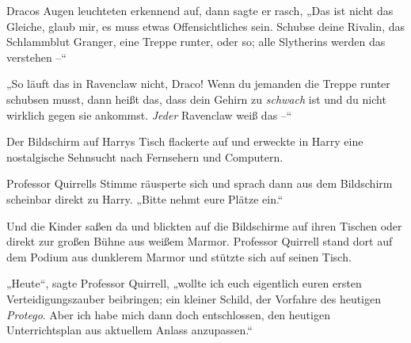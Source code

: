 Dracos Augen leuchteten erkennend auf, dann sagte er rasch, „Das ist nicht das Gleiche, glaub mir, es muss etwas Offensichtliches sein. Schubse deine Rivalin, das Schlammblut Granger, eine Treppe runter, oder so; alle Slytherins werden das verstehen –“

„So läuft das in Ravenclaw nicht, Draco! Wenn du jemanden die Treppe runter schubsen musst, dann heißt das, dass dein Gehirn zu \emph{schwach} ist und du nicht wirklich gegen sie ankommst. \emph{Jeder} Ravenclaw weiß das –“

Der Bildschirm auf Harrys Tisch flackerte auf und erweckte in Harry eine nostalgische Sehnsucht nach Fernsehern und Computern.

Professor Quirrells Stimme räusperte sich und sprach dann aus dem Bildschirm scheinbar direkt zu Harry. „Bitte nehmt eure Plätze ein.“

\later

Und die Kinder saßen da und blickten auf die Bildschirme auf ihren Tischen oder direkt zur großen Bühne aus weißem Marmor. Professor Quirrell stand dort auf dem Podium aus dunklerem Marmor und stützte sich auf seinen Tisch.

„Heute“, sagte Professor Quirrell, „wollte ich euch eigentlich euren ersten Verteidigungszauber beibringen; ein kleiner Schild, der Vorfahre des heutigen \emph{Protego}. Aber ich habe mich dann doch entschlossen, den heutigen Unterrichtsplan aus aktuellem Anlass anzupassen.“

